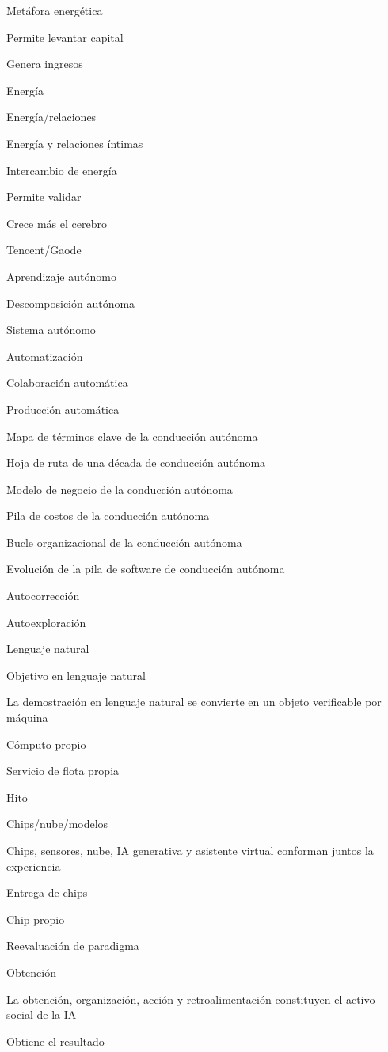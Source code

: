 \documentclass{article}
\begin{document}
Metáfora energética

Permite levantar capital

Genera ingresos

Energía

Energía/relaciones

Energía y relaciones íntimas

Intercambio de energía

Permite validar

Crece más el cerebro

Tencent/Gaode

Aprendizaje autónomo

Descomposición autónoma

Sistema autónomo

Automatización

Colaboración automática

Producción automática

Mapa de términos clave de la conducción autónoma

Hoja de ruta de una década de conducción autónoma

Modelo de negocio de la conducción autónoma

Pila de costos de la conducción autónoma

Bucle organizacional de la conducción autónoma

Evolución de la pila de software de conducción autónoma

Autocorrección

Autoexploración

Lenguaje natural

Objetivo en lenguaje natural

La demostración en lenguaje natural se convierte en un objeto verificable por máquina

Cómputo propio

Servicio de flota propia

Hito

Chips/nube/modelos

Chips, sensores, nube, IA generativa y asistente virtual conforman juntos la experiencia

Entrega de chips

Chip propio

Reevaluación de paradigma

Obtención

La obtención, organización, acción y retroalimentación constituyen el activo social de la IA

Obtiene el resultado
\end{document}
